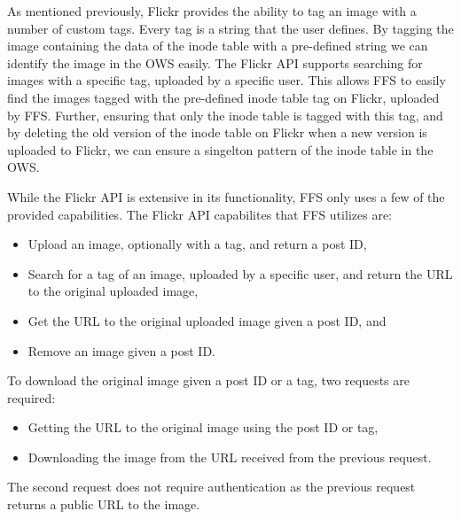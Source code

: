 As mentioned previously, Flickr provides the ability to tag an image with a number of custom tags. Every tag is a string that the user defines. By tagging the image containing the data of the inode table with a pre-defined string we can identify the image in the OWS easily. The Flickr API supports searching for images with a specific tag, uploaded by a specific user. This allows FFS to easily find the images tagged with the pre-defined inode table tag on Flickr, uploaded by FFS. Further, ensuring that only the inode table is tagged with this tag, and by deleting the old version of the inode table on Flickr when a new version is uploaded to Flickr, we can ensure a singelton pattern of the inode table in the OWS. 

While the Flickr API is extensive in its functionality, FFS only uses a few of the provided capabilities. The Flickr API capabilites that FFS utilizes are:
\begin{itemize}
	\item Upload an image, optionally with a tag, and return a post ID,
	\item Search for a tag of an image, uploaded by a specific user, and return the URL to the original uploaded image,
	\item Get the URL to the original uploaded image given a post ID, and
	\item Remove an image given a post ID.
\end{itemize}

To download the original image given a post ID or a tag, two requests are required:
\begin{itemize}
	\item Getting the URL to the original image using the post ID or tag,
	\item Downloading the image from the URL received from the previous request.
\end{itemize}
The second request does not require authentication as the previous request returns a public URL to the image. 

